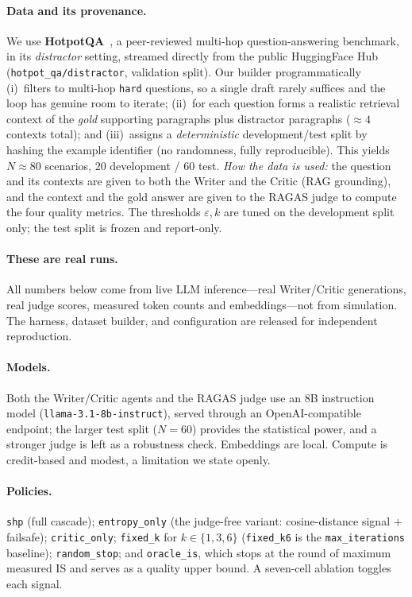 \documentclass[conference]{IEEEtran}
\begin{document}
\paragraph{Data and its provenance.} We use \textbf{HotpotQA}~\cite{hotpotqa}, a
peer-reviewed multi-hop question-answering benchmark, in its \emph{distractor}
setting, streamed directly from the public HuggingFace Hub
(\texttt{hotpot\_qa/distractor}, validation split). Our builder programmatically
(i)~filters to multi-hop \texttt{hard} questions, so a single draft rarely
suffices and the loop has genuine room to iterate; (ii)~for each question forms a
realistic retrieval context of the \emph{gold} supporting paragraphs plus
distractor paragraphs ($\approx4$ contexts total); and (iii)~assigns a
\emph{deterministic} development/test split by hashing the example identifier (no
randomness, fully reproducible). This yields $N\!\approx\!80$ scenarios,
$20$ development / $60$ test. \emph{How the data is used:} the question and its
contexts are given to both the Writer and the Critic (RAG grounding), and the
context and the gold answer are given to the RAGAS judge to compute the four
quality metrics. The thresholds $\varepsilon,k$ are tuned on the development split
only; the test split is frozen and report-only.

\paragraph{These are real runs.} All numbers below come from live LLM
inference---real Writer/Critic generations, real judge scores, measured token
counts and embeddings---not from simulation. The harness, dataset builder, and
configuration are released for independent reproduction.
\paragraph{Models.} Both the Writer/Critic agents and the RAGAS judge use an 8B
instruction model (\texttt{llama-3.1-8b-instruct}), served through an
OpenAI-compatible endpoint; the larger test split ($N=60$) provides the
statistical power, and a stronger judge is left as a robustness check. Embeddings
are local. Compute is credit-based and modest, a limitation we state openly.
\paragraph{Policies.} \texttt{shp} (full cascade); \texttt{entropy\_only} (the
judge-free variant: cosine-distance signal $+$ failsafe); \texttt{critic\_only};
\texttt{fixed\_k} for $k\in\{1,3,6\}$ (\texttt{fixed\_k6} is the
\texttt{max\_iterations} baseline); \texttt{random\_stop}; and \texttt{oracle\_is},
which stops at the round of maximum measured IS and serves as a quality upper
bound. A seven-cell ablation toggles each signal.
\end{document}
